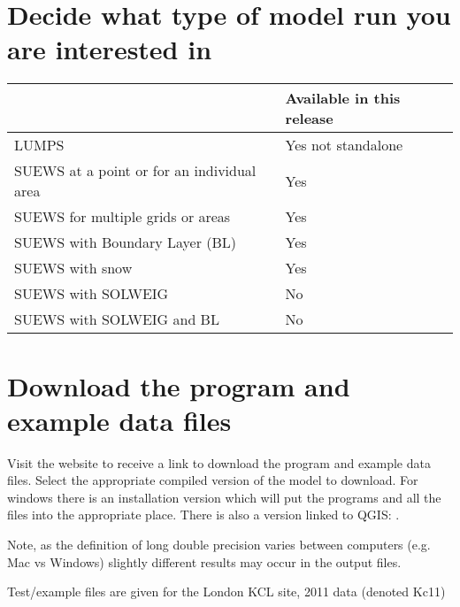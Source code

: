 \documentclass[letterpaper,10pt,english]{sphinxmanual}
\begin{document}


\section{Decide what type of model run you are interested in}
\label{\detokenize{prepare-to-run-the-model:decide-what-type-of-model-run-you-are-interested-in}}

\begin{savenotes}\sphinxattablestart
\centering
\begin{tabulary}{\linewidth}[t]{|T|T|}
\hline
\sphinxstyletheadfamily &\sphinxstyletheadfamily 
Available in this release
\\
\hline
LUMPS
&
Yes \textendash{} not standalone
\\
\hline
SUEWS at a point or for an individual area
&
Yes
\\
\hline
SUEWS for multiple grids or areas
&
Yes
\\
\hline
SUEWS with Boundary Layer (BL)
&
Yes
\\
\hline
SUEWS with snow
&
Yes
\\
\hline
SUEWS with SOLWEIG
&
No
\\
\hline
SUEWS with SOLWEIG and BL
&
No
\\
\hline
\end{tabulary}
\par
\sphinxattableend\end{savenotes}


\section{Download the program and example data files}
\label{\detokenize{prepare-to-run-the-model:download-the-program-and-example-data-files}}
Visit the website to receive a link to download the program and example
data files. Select the appropriate compiled version of the model to
download. For windows there is an installation version which will put
the programs and all the files into the appropriate place. There is also
a version linked to QGIS:
.

Note, as the definition of long double precision varies between
computers (e.g. Mac vs Windows) slightly different results may occur in
the output files.

Test/example files are given for the London KCL site, 2011 data (denoted
Kc11)
\end{document}
